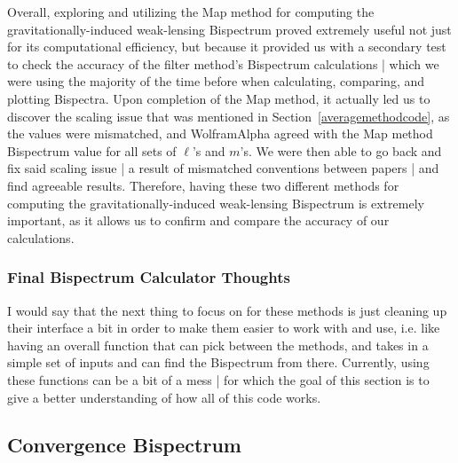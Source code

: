 \documentclass[11pt]{article}
\renewcommand{\_}[1]{\underline{ #1 }}
\begin{document}
{Overall, exploring and utilizing the Map method for computing the gravitationally-induced weak-lensing Bispectrum proved extremely useful not just for its computational efficiency, but because it provided us with a secondary test to check the accuracy of the filter method's Bispectrum calculations | which we were using the majority of the time before when calculating, comparing, and plotting Bispectra. Upon completion of the Map method, it actually led us to discover the scaling issue that was mentioned in Section~\ref{averagemethodcode}, as the values were mismatched, and WolframAlpha agreed with the Map method Bispectrum value for all sets of $\ell$'s and $m$'s. We were then able to go back and fix said scaling issue | a result of mismatched conventions between papers | and find agreeable results. Therefore, having these two different methods for computing the gravitationally-induced weak-lensing Bispectrum is extremely important, as it allows us to confirm and compare the accuracy of our calculations.

\subsubsection{Final Bispectrum Calculator Thoughts}

I would say that the next thing to focus on for these methods is just cleaning up their interface a bit in order to make them easier to work with and use, i.e. like having an overall function that can pick between the methods, and takes in a simple set of inputs and can find the Bispectrum from there. Currently, using these functions can be a bit of a mess | for which the goal of this section is to give a better understanding of how all of this code works.

\subsection{Convergence Bispectrum}

}
\end{document}
